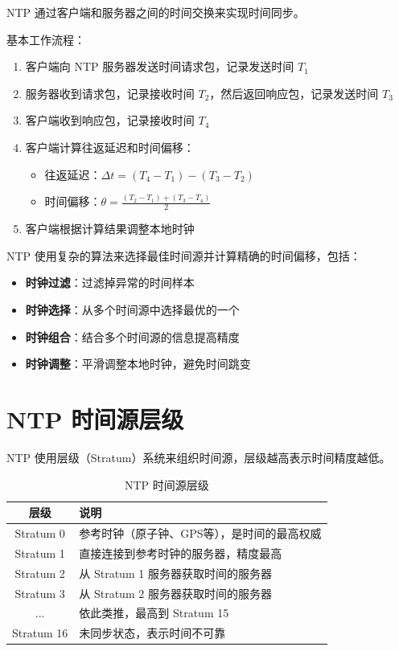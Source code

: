 \documentclass[12pt,UTF8]{ctexbook}
\begin{document}
NTP 通过客户端和服务器之间的时间交换来实现时间同步。

基本工作流程：
\begin{enumerate}
    \item 客户端向 NTP 服务器发送时间请求包，记录发送时间 $T_1$
    
    \item 服务器收到请求包，记录接收时间 $T_2$，然后返回响应包，记录发送时间 $T_3$
    
    \item 客户端收到响应包，记录接收时间 $T_4$
    
    \item 客户端计算往返延迟和时间偏移：
    \begin{itemize}
        \item 往返延迟：$\Delta t = (T_4 - T_1) - (T_3 - T_2)$
        \item 时间偏移：$\theta = \frac{(T_2 - T_1) + (T_3 - T_4)}{2}$
    \end{itemize}
    
    \item 客户端根据计算结果调整本地时钟
\end{enumerate}

NTP 使用复杂的算法来选择最佳时间源并计算精确的时间偏移，包括：
\begin{itemize}
    \item \textbf{时钟过滤}：过滤掉异常的时间样本
    \item \textbf{时钟选择}：从多个时间源中选择最优的一个
    \item \textbf{时钟组合}：结合多个时间源的信息提高精度
    \item \textbf{时钟调整}：平滑调整本地时钟，避免时间跳变
\end{itemize}

\section{NTP 时间源层级}
\label{sec:ntp_stratum}

NTP 使用层级（Stratum）系统来组织时间源，层级越高表示时间精度越低。

\begin{table}[htbp]
    \centering
    \caption{NTP 时间源层级}
    \begin{tabular}{|c|p{8cm}|}
        \hline
        \textbf{层级} & \textbf{说明} \\
        \hline
        Stratum 0 & 参考时钟（原子钟、GPS等），是时间的最高权威 \\
        \hline
        Stratum 1 & 直接连接到参考时钟的服务器，精度最高 \\
        \hline
        Stratum 2 & 从 Stratum 1 服务器获取时间的服务器 \\
        \hline
        Stratum 3 & 从 Stratum 2 服务器获取时间的服务器 \\
        \hline
        ... & 依此类推，最高到 Stratum 15 \\
        \hline
        Stratum 16 & 未同步状态，表示时间不可靠 \\
        \hline
    \end{tabular}
\end{table}
\end{document}

